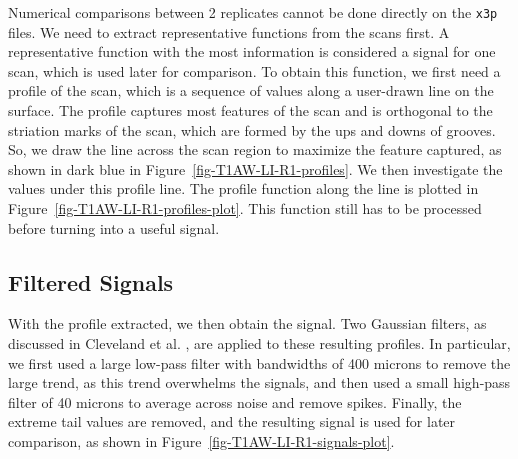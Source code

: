 \documentclass[fleqn,10pt]{wlscirep}
\begin{document}
Numerical comparisons between 2 replicates cannot be done directly on
the \texttt{x3p} files. We need to extract representative functions from
the scans first. A representative function with the most information is
considered a signal for one scan, which is used later for comparison. To
obtain this function, we first need a profile of the scan, which is a
sequence of values along a user-drawn line on the surface. The profile
captures most features of the scan and is orthogonal to the striation
marks of the scan, which are formed by the ups and downs of grooves. So,
we draw the line across the scan region to maximize the feature
captured, as shown in dark blue in Figure~\ref{fig-T1AW-LI-R1-profiles}.
We then investigate the values under this profile line. The profile
function along the line is plotted in
Figure~\ref{fig-T1AW-LI-R1-profiles-plot}. This function still has to be
processed before turning into a useful signal.

\subsection*{Filtered Signals}\label{sec-filtered-signals}

With the profile extracted, we then obtain the signal. Two Gaussian
filters, as discussed in Cleveland et al.
\citep{clevelandLocalRegressionModels1992}, are applied to these
resulting profiles. In particular, we first used a large low-pass filter
with bandwidths of 400 microns to remove the large trend, as this trend
overwhelms the signals, and then used a small high-pass filter of 40
microns to average across noise and remove spikes. Finally, the extreme
tail values are removed, and the resulting signal is used for later
comparison, as shown in Figure~\ref{fig-T1AW-LI-R1-signals-plot}.
\end{document}

